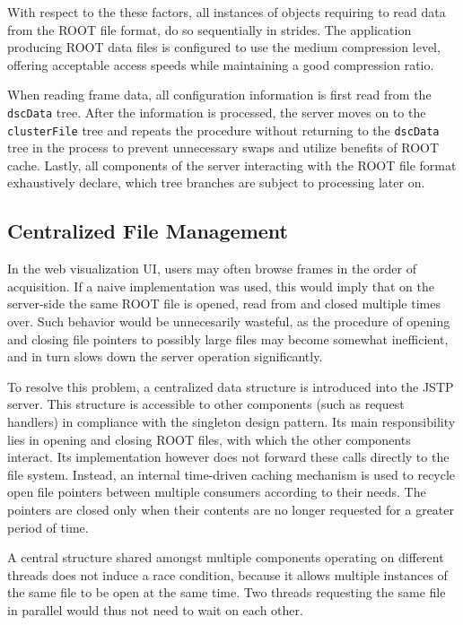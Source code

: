 With respect to the these factors, all instances of objects requiring to read data from the ROOT file format, do so sequentially in strides. The application producing ROOT data files is configured to use the medium compression level, offering acceptable access speeds while maintaining a good compression ratio.

When reading frame data, all configuration information is first read from the \texttt{dscData} tree. After the information is processed, the server moves on to the \texttt{clusterFile} tree and repeats the procedure without returning to the \texttt{dscData} tree in the process to prevent unnecessary swaps and utilize benefits of ROOT cache. Lastly, all components of the server interacting with the ROOT file format exhaustively declare, which tree branches are subject to processing later on.

\subsection{Centralized File Management}
In the web visualization UI, users may often browse frames in the order of acquisition. If a naive implementation was used, this would imply that on the server-side the same ROOT file is opened, read from and closed multiple times over. Such behavior would be unnecesarily wasteful, as the procedure of opening and closing file pointers to possibly large files may become somewhat inefficient, and in turn slows down the server operation significantly.

To resolve this problem, a centralized data structure is introduced into the JSTP server. This structure is accessible to other components (such as request handlers) in compliance with the singleton design pattern. Its main responsibility lies in opening and closing ROOT files, with which the other components interact. Its implementation however does not forward these calls directly to the file system. Instead, an internal time-driven caching mechanism is used to recycle open file pointers between multiple consumers according to their needs. The pointers are closed only when their contents are no longer requested for a greater period of time.

A central structure shared amongst multiple components operating on different threads does not induce a race condition, because it allows multiple instances of the same file to be open at the same time. Two threads requesting the same file in parallel would thus not need to wait on each other.

